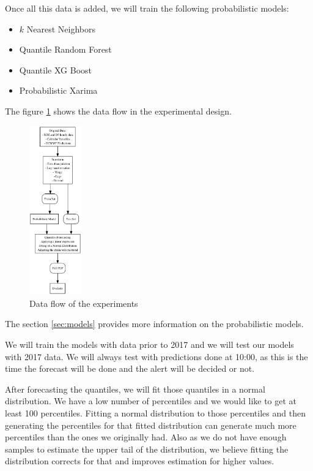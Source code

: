 \documentclass[a4paper,twocolumn,5p]{elsarticle}
\begin{document}
Once all this data is added, we will train the following probabilistic 
models:
\begin{itemize}
  \item $k$ Nearest Neighbors
  \item Quantile Random Forest
  \item Quantile XG Boost
  \item Probabilistic Xarima
\end{itemize} 

The figure \ref{figure:dataflow} shows the data flow in the experimental design.  

\begin{figure}
  \centering
  \includegraphics[width=0.2\textwidth]{diagrams/flow}
  \caption{Data flow of the experiments}
  \label{figure:dataflow}
\end{figure}

The section \ref{sec:models} provides more information on the probabilistic models.

We will train the models with data prior to 2017 and we will test our 
models with 2017 data. We will always test with 
predictions done at 10:00, as this is the time the 
forecast will be done and the alert will be decided 
or not.

After forecasting the quantiles, we will fit those quantiles in a normal distribution.
We have a low number of percentiles and we would like to get at least 100 percentiles.
Fitting a normal distribution to those percentiles and then generating the 
percentiles for that fitted distribution can generate much more percentiles 
than the ones we originally had.
Also as we do not have enough samples to estimate the upper tail of the distribution, 
we believe
fitting the distribution corrects for that and improves estimation for higher values.
\end{document}
